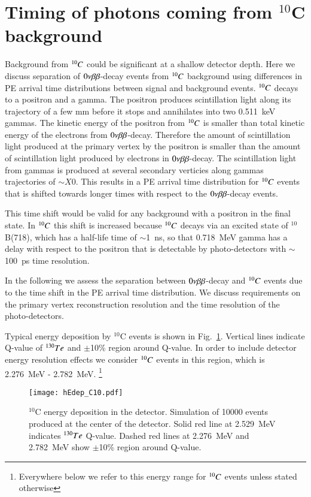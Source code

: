 \section{Timing of photons coming from $^{10}$C background}

Background from $^{10}C$ could be significant at a shallow detector depth.
Here we discuss separation of $0\nu\beta\beta$-decay events from $^{10}C$ background using 
differences in PE arrival time distributions between signal and background events.
$^{10}C$ decays to a positron and a gamma. The positron produces scintillation light 
along its trajectory of a few mm before it stops and annihilates into two 0.511~keV 
gammas. The kinetic energy of the positron from $^{10}C$ is smaller than total kinetic
energy of the electrons from $0\nu\beta\beta$-decay. Therefore the amount of scintillation 
light produced at the primary vertex by the positron is smaller than the amount of 
scintillation light produced by electrons in $0\nu\beta\beta$-decay. The scintillation light from 
gammas is produced at several secondary verticies along gammas trajectories of $\sim X0$. 
This results in a PE arrival time distribution for $^{10}C$ events that is shifted towards 
longer times with respect to the $0\nu\beta\beta$-decay events.

This time shift would be valid for any background with a positron in the final state. In 
$^{10}C$ this shift is increased because $^{10}C$ decays via an excited state of $^{10}$B(718),
which has a half-life time of $\sim$1~ns, so that 0.718~MeV gamma has a delay with respect
to the positron that is detectable by photo-detectors with $\sim$100~ps time resolution.

In the following we assess the separation between $0\nu\beta\beta$-decay and $^{10}C$ events due to the 
time shift in the PE arrival time distribution. We discuss requirements on the primary vertex 
reconstruction resolution and the time resolution of the photo-detectors.


Typical energy deposition by $^{10}$C events is shown in
Fig.~\ref{fig:Edep_C10}. Vertical lines indicate Q-value of $^{130}Te$ and 
$\pm$10\% region around Q-value. In order to include detector energy resolution 
effects we consider $^{10}C$ events in this region, which is 2.276~MeV - 2.782~MeV.
\footnote{Everywhere below we refer to this energy range for $^{10}C$ events unless 
stated otherwise}


\begin{figure}[h]
  \centering
  \texttt{[image: hEdep\_C10.pdf]}
  \caption{$^{10}$C energy deposition in the detector. Simulation of 10000 events
  produced at the center of the detector. Solid red line at 2.529~MeV indicates $^{130}Te$ 
  Q-value. Dashed red lines at 2.276~MeV and 2.782~MeV show $\pm$10\% region around 
  Q-value.}
  \label{fig:Edep_C10}
\end{figure}

